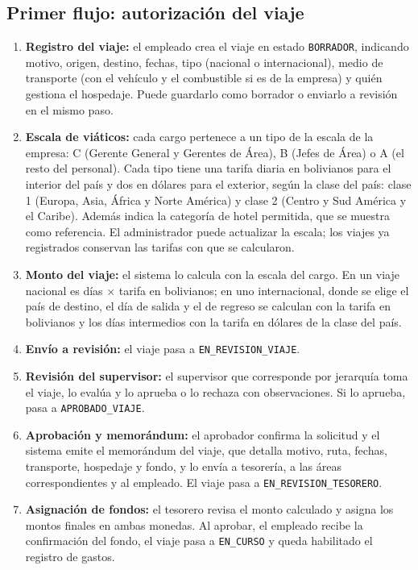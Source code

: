 \documentclass[11pt,letterpaper]{article}
\newcommand{\code}[1]{\nolinkurl{#1}}
\begin{document}
\subsection{Primer flujo: autorización del viaje}
\begin{enumerate}
  \item \textbf{Registro del viaje:} el empleado crea el viaje en estado \code{BORRADOR}, indicando motivo, origen, destino, fechas, tipo (nacional o internacional), medio de transporte (con el vehículo y el combustible si es de la empresa) y quién gestiona el hospedaje. Puede guardarlo como borrador o enviarlo a revisión en el mismo paso.
  \item \textbf{Escala de viáticos:} cada cargo pertenece a un tipo de la escala de la empresa: C (Gerente General y Gerentes de Área), B (Jefes de Área) o A (el resto del personal). Cada tipo tiene una tarifa diaria en bolivianos para el interior del país y dos en dólares para el exterior, según la clase del país: clase 1 (Europa, Asia, África y Norte América) y clase 2 (Centro y Sud América y el Caribe). Además indica la categoría de hotel permitida, que se muestra como referencia. El administrador puede actualizar la escala; los viajes ya registrados conservan las tarifas con que se calcularon.
  \item \textbf{Monto del viaje:} el sistema lo calcula con la escala del cargo. En un viaje nacional es días × tarifa en bolivianos; en uno internacional, donde se elige el país de destino, el día de salida y el de regreso se calculan con la tarifa en bolivianos y los días intermedios con la tarifa en dólares de la clase del país.
  \item \textbf{Envío a revisión:} el viaje pasa a \code{EN_REVISION_VIAJE}.
  \item \textbf{Revisión del supervisor:} el supervisor que corresponde por jerarquía toma el viaje, lo evalúa y lo aprueba o lo rechaza con observaciones. Si lo aprueba, pasa a \code{APROBADO_VIAJE}.
  \item \textbf{Aprobación y memorándum:} el aprobador confirma la solicitud y el sistema emite el memorándum del viaje, que detalla motivo, ruta, fechas, transporte, hospedaje y fondo, y lo envía a tesorería, a las áreas correspondientes y al empleado. El viaje pasa a \code{EN_REVISION_TESORERO}.
  \item \textbf{Asignación de fondos:} el tesorero revisa el monto calculado y asigna los montos finales en ambas monedas. Al aprobar, el empleado recibe la confirmación del fondo, el viaje pasa a \code{EN_CURSO} y queda habilitado el registro de gastos.
\end{enumerate}
\end{document}
